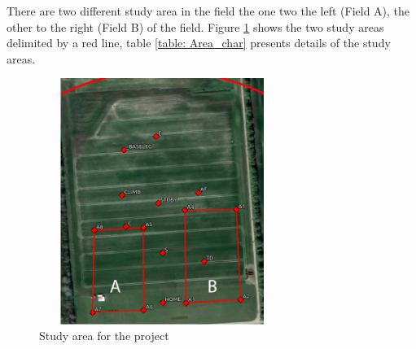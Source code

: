 There are two different study area in the field the one two the left (Field A), the other to the right (Field B) of the field. Figure \ref{fig:Study area} shows  the two study areas delimited by a red line, table \ref{table: Area_char} presents details of the study areas.
\begin{figure}[H]
\centering
\includegraphics[width=8cm,height=8cm,keepaspectratio]{imagenes/Study_Area.png}
\caption{Study area for the project}
\label{fig:Study area}
\end{figure}

